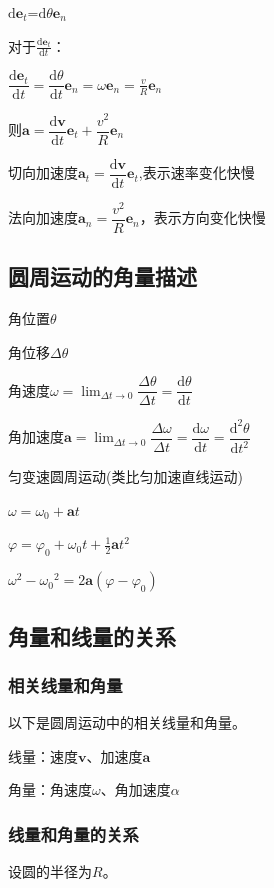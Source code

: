 	$\mathrm{d}\mathbf{e}_t$=$\mathrm{d}\theta\mathbf{e} _n$
	
	\vspace{12pt}
	
	{对于$\frac{\mathrm{d}\mathbf{e}_t}{\mathrm{d}t}$：}

	$\dfrac{\mathrm{d}\mathbf{e}_t}{\mathrm{d}t}=\dfrac{\mathrm{d}\theta}{\mathrm{d}t}\mathbf{e}_n=\omega\mathbf{e} _n=\frac{v}{R}\mathbf{e} _n$
	
	{则$\mathbf{a}=\dfrac{\mathrm{d}\mathbf{v}}{\mathrm{d}t}\mathbf{e}_t+\dfrac{v^2}{R}\mathbf{e} _n$}
	
	{切向加速度$\mathbf{a}_t=\dfrac{\mathrm{d}\mathbf{v}}{\mathrm{d}t}\mathbf{e}_t$,表示速率变化快慢}
	
	{法向加速度$\mathbf{a}_n=\dfrac{v^2}{R}\mathbf{e} _n$，表示方向变化快慢}


\subsection{圆周运动的角量描述}

{角位置$\theta$}

{角位移$\Delta\theta$}

{角速度$\omega=\lim_{{\Delta}t\rightarrow0}\dfrac{\Delta\theta}{\Delta t}=\dfrac{\mathrm{d}\theta}{\mathrm{d}t}$}

{角加速度$\mathbf{a}=\lim_{{\Delta}t\rightarrow0}\dfrac{\Delta\omega}{\Delta t}=\dfrac{\mathrm{d}\omega}{\mathrm{d}t}=\dfrac{\mathrm{d}^2\theta}{\mathrm{d}t^2}$}

{匀变速圆周运动(类比匀加速直线运动)}

{$\omega=\omega_0 +\mathbf{a}t$}

{$\varphi=\varphi_0 +\omega_0 t+\frac{1}{2}\mathbf{a}t^2$}

{$\omega^2-{\omega_0}^2=2\mathbf{a}(\varphi-\varphi_0)$}


\subsection{角量和线量的关系}
\subsubsection{相关线量和角量}
以下是圆周运动中的相关线量和角量。

线量：速度$\mathbf{v}$、加速度$\mathbf{a}$

角量：角速度$\omega$、角加速度$\alpha$

\subsubsection{线量和角量的关系}
设圆的半径为$R$。


